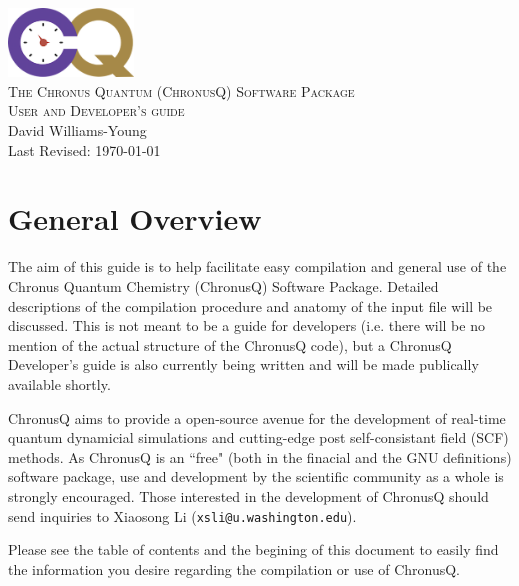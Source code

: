 \documentclass[12pt]{article}
\makeatletter
\newcommand{\XiaosongContact}{Xiaosong Li (\texttt{xsli@u.washington.edu})}
\makeatother
\begin{document}
  \begin{titlepage}
    \vspace*{\fill}
    \begin{center}
      \includegraphics[width=0.25\textwidth]{./chronus_quantum_logo.png}~\\[1cm]
      \textsc{\LARGE The Chronus Quantum (ChronusQ) Software Package}~\\[0.5cm]
      \textsc{\Large User and Developer's guide}~\\[5cm]
      \large David Williams-Young\\
      \large Last Revised: \today
    \end{center}
    \vspace*{\fill}
  \end{titlepage}
  \tableofcontents

  \newpage

  \section{General Overview} \label{sec:GeneralOverView}

  The aim of this guide is to help facilitate easy compilation and general use of
  the Chronus Quantum Chemistry (ChronusQ) Software Package. Detailed descriptions
  of the compilation procedure and anatomy of the input file will be discussed.
  This is not meant to be a guide for developers (i.e. there will be no mention of
  the actual structure of the ChronusQ code), but a ChronusQ Developer's guide is
  also currently being written and will be made publically available shortly.

  ChronusQ aims to provide a open-source avenue for the development of real-time
  quantum dynamicial simulations and cutting-edge post self-consistant field (SCF)
  methods.  As ChronusQ is an ``free" (both in the finacial and the GNU definitions)  software package, use and development by the scientific community as a whole is 
  strongly encouraged. Those interested in the development of ChronusQ should send 
  inquiries to \XiaosongContact.

  Please see the table of contents and the begining of this document to easily find
  the information you desire regarding the compilation or use of ChronusQ.
\end{document}
